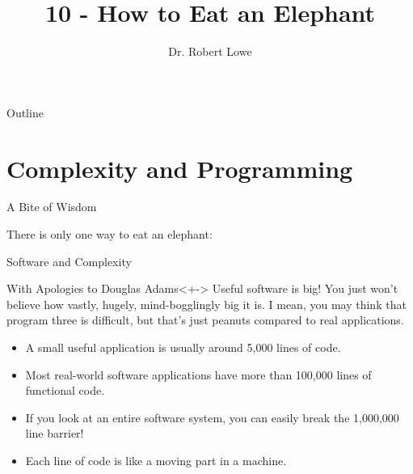 \documentclass[]{beamer}
\title{10 - How to Eat an Elephant}
\author{Dr. Robert Lowe\\}
\institute[Maryville College] %
{
  Division of Mathematics and Computer Science\\
  Maryville College
}
\date[]{}
\begin{document}
\begin{frame}
  \titlepage
\end{frame}

\begin{frame}{Outline}
  \tableofcontents
\end{frame}





\section{Complexity and Programming}
\begin{frame}{A Bite of Wisdom}
    \begin{block}{}
    There is only one way to eat an elephant: 
    \end{block}
\end{frame}

\begin{frame}{Software and Complexity}
    \begin{block}{With Apologies to Douglas Adams}<+->
        Useful software is big!  You just won't believe how vastly, 
        hugely, mind-bogglingly big it is.  I mean, you may think that
        program three is difficult, but that's just peanuts compared
        to real applications.
    \end{block}

    \begin{itemize}[<+->]
        \item A small useful application is usually around 5,000 lines
            of code.
        \item Most real-world software applications have more than
            100,000 lines of functional code.
        \item If you look at an entire software system, you can easily
            break the 1,000,000 line barrier!
        \item Each line of code is like a moving part in a machine.
    \end{itemize}
\end{frame}
\end{document}

